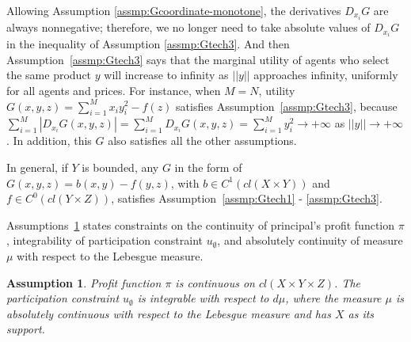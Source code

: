 \documentclass[a4paper, 11pt]{amsart}
\numberwithin{equation}{section}
\theoremstyle{plain}
\newtheorem{assumption}{Assumption}
\theoremstyle{definition}
\theoremstyle{remark}
\begin{document}
{Allowing Assumption \ref{assmp:Gcoordinate-monotone}, {the derivatives $D_{x_i}G$ are always nonnegative; therefore,} we no longer need to take absolute values of $D_{x_i}G$ in the inequality of Assumption \ref{assmp:Gtech3}.} And then Assumption~\ref{assmp:Gtech3} says that the marginal utility of agents who select the same product $y$ will increase to infinity as $||y||$ approaches infinity, uniformly for all agents and prices. {For instance, when $M = N$, utility $G(x,y,z) = \sum_{i=1}^{M} x_iy_i^2 -f(z) $ satisfies Assumption~\ref{assmp:Gtech3}, because $\sum_{i=1}^{M} |D_{x_i}G(x,y,z)| = \sum_{i=1}^{M} D_{x_i}G(x,y,z) = \sum_{i=1}^{M} y_i^2 \longrightarrow +\infty$ as $||y|| \longrightarrow + \infty$. In addition, this $G$ also satisfies all the other assumptions.}\medskip


In general, if $Y$ is bounded, any $G$ in the form of $G(x,y,z) = b(x,y) - f(y,z)$, with $b \in C^1(cl(X\times Y))$ and $f\in C^0(cl(Y \times Z))$, satisfies Assumption~\ref{assmp:Gtech1} - \ref{assmp:Gtech3}.\medskip




Assumptions~\ref{assmp:Pi1} states constraints on the continuity of principal's profit function $\pi$, integrability of participation constraint $u_{\emptyset}$, and absolutely continuity of measure $\mu$ with respect to the Lebesgue measure. 


\begin{assumption}\label{assmp:Pi1}
	Profit function $\pi$ is continuous on $cl(X\times Y\times Z)$. The participation constraint $u_{\emptyset}$ is integrable with respect to $d \mu$, where the measure $\mu$ is absolutely continuous with respect to the Lebesgue measure and has $X$ as its support.
\end{assumption}



\end{document}
